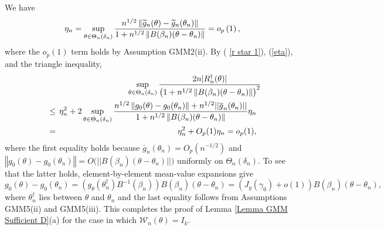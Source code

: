\documentclass[12pt,titlepage,final,oneside,letterpaper]{article}
\begin{document}
We have 
\begin{equation}
\eta _{n}=\sup_{\theta \in \Theta _{n}\left( \delta _{n}\right) }\frac{%
n^{1/2}\left\Vert \widetilde{g}_{n}(\theta )-\widetilde{g}_{n}(\theta
_{n})\right\Vert }{1+n^{1/2}\left\Vert B(\beta _{n})(\theta -\theta
_{n})\right\Vert }=o_{p}\left( 1\right) ,  \label{eta}
\end{equation}%
where the $o_{p}\left( 1\right) $ term holds by Assumption GMM2(ii)$.$ By (%
\ref{r star 1}), (\ref{eta}), and the triangle inequality,%
\begin{eqnarray}
&&\hspace{-0.08in}\sup_{\theta \in \Theta _{n}\left( \delta _{n}\right) }%
\frac{2n|R_{n}^{\dag }(\theta )|}{\left( 1+n^{1/2}\left\Vert B(\beta
_{n})(\theta -\theta _{n})\right\Vert \right) ^{2}}\hspace{-0.08in}  \notag
\\
&\leq &\hspace{-0.08in}\eta _{n}^{2}+2\sup_{\theta \in \Theta _{n}\left(
\delta _{n}\right) }\frac{n^{1/2}\left\Vert g_{0}(\theta )-g_{0}(\theta
_{n})\right\Vert +n^{1/2}||\overline{g}_{n}(\theta _{n})||}{%
1+n^{1/2}\left\Vert B(\beta _{n})(\theta -\theta _{n})\right\Vert }\eta _{n}
\notag \\
&=&\hspace{-0.08in}\eta _{n}^{2}+O_{p}(1)\eta _{n}=o_{p}(1),
\end{eqnarray}%
where the first equality holds because $\overline{g}_{n}\left( \theta
_{n}\right) =O_{p}(n^{-1/2})$ and $\left\Vert g_{0}\left( \theta \right)
-g_{0}\left( \theta _{n}\right) \right\Vert =O(||B(\beta _{n})$\allowbreak $%
(\theta -\theta _{n})||)$ uniformly on $\Theta _{n}\left( \delta _{n}\right)
.$ To see that the latter holds, element-by-element mean-value expansions
give%
\begin{equation}
g_{0}\left( \theta \right) -g_{0}\left( \theta _{n}\right) =(g_{\theta
}(\theta _{n}^{\dag })B^{-1}(\beta _{n}))B\left( \beta _{n}\right) \left(
\theta -\theta _{n}\right) =\left( J_{g}(\gamma _{0})+o\left( 1\right)
\right) B\left( \beta _{n}\right) \left( \theta -\theta _{n}\right) ,
\label{G diff}
\end{equation}%
where $\theta _{n}^{\dag }$ lies between $\theta $ and $\theta _{n}$ and the
last equality follows from Assumptions GMM5(ii) and GMM5(iii). This
completes the proof of Lemma \ref{Lemma GMM Sufficient D}(a) for the case in
which $\mathcal{W}_{n}\left( \theta \right) =I_{k}.$
\end{document}
